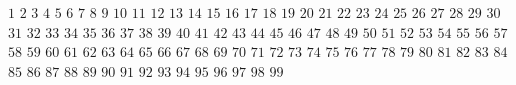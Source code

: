 $1$ \quad
$2$ \quad
$3$ \quad
$4$ \quad
$5$ \quad
$6$ \quad
$7$ \quad
$8$ \quad
$9$ \quad
$10$ \quad
$11$ \quad
$12$ \quad
$13$ \quad
$14$ \quad
$15$ \quad
$16$ \quad
$17$ \quad
$18$ \quad
$19$ \quad
$20$ \quad
$21$ \quad
$22$ \quad
$23$ \quad
$24$ \quad
$25$ \quad
$26$ \quad
$27$ \quad
$28$ \quad
$29$ \quad
$30$ \quad
$31$ \quad
$32$ \quad
$33$ \quad
$34$ \quad
$35$ \quad
$36$ \quad
$37$ \quad
$38$ \quad
$39$ \quad
$40$ \quad
$41$ \quad
$42$ \quad
$43$ \quad
$44$ \quad
$45$ \quad
$46$ \quad
$47$ \quad
$48$ \quad
$49$ \quad
$50$ \quad
$51$ \quad
$52$ \quad
$53$ \quad
$54$ \quad
$55$ \quad
$56$ \quad
$57$ \quad
$58$ \quad
$59$ \quad
$60$ \quad
$61$ \quad
$62$ \quad
$63$ \quad
$64$ \quad
$65$ \quad
$66$ \quad
$67$ \quad
$68$ \quad
$69$ \quad
$70$ \quad
$71$ \quad
$72$ \quad
$73$ \quad
$74$ \quad
$75$ \quad
$76$ \quad
$77$ \quad
$78$ \quad
$79$ \quad
$80$ \quad
$81$ \quad
$82$ \quad
$83$ \quad
$84$ \quad
$85$ \quad
$86$ \quad
$87$ \quad
$88$ \quad
$89$ \quad
$90$ \quad
$91$ \quad
$92$ \quad
$93$ \quad
$94$ \quad
$95$ \quad
$96$ \quad
$97$ \quad
$98$ \quad
$99$ 

\vfill\supereject
